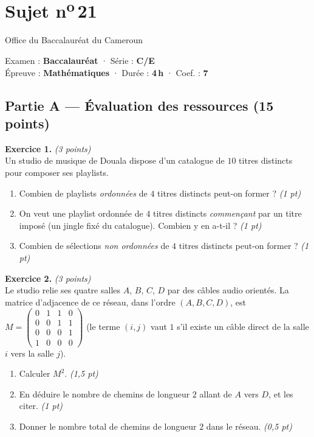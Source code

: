 \section{Sujet n\textsuperscript{o}\,21}
\noindent\begin{minipage}{0.5\linewidth}\footnotesize Office du Baccalauréat du Cameroun\end{minipage}%
\hfill\begin{minipage}{0.45\linewidth}\footnotesize\raggedleft Examen : \textbf{Baccalauréat} · Série : \textbf{C/E}\\
Épreuve : \textbf{Mathématiques} · Durée : \textbf{4\,h} · Coef. : \textbf{7}\end{minipage}
\par\smallskip{\color{onbo}\rule{\linewidth}{1pt}}

\subsection*{Partie A — Évaluation des ressources \hfill (15 points)}

\noindent\textbf{Exercice 1.} \hfill\textit{(3 points)}\\
Un studio de musique de Douala dispose d'un catalogue de $10$ titres distincts pour
composer ses playlists.
\begin{enumerate}[label=\arabic*)]
\item Combien de playlists \emph{ordonnées} de $4$ titres distincts peut-on former ? \hfill\textit{(1 pt)}
\item On veut une playlist ordonnée de $4$ titres distincts \emph{commençant} par un titre
imposé (un jingle fixé du catalogue). Combien y en a-t-il ? \hfill\textit{(1 pt)}
\item Combien de sélections \emph{non ordonnées} de $4$ titres distincts peut-on former ? \hfill\textit{(1 pt)}
\end{enumerate}

\smallskip
\noindent\textbf{Exercice 2.} \hfill\textit{(3 points)}\\
Le studio relie ses quatre salles $A$, $B$, $C$, $D$ par des câbles audio orientés. La
matrice d'adjacence de ce réseau, dans l'ordre $(A,B,C,D)$, est
$\displaystyle M=\begin{pmatrix}0&1&1&0\\0&0&1&1\\0&0&0&1\\1&0&0&0\end{pmatrix}$
(le terme $(i,j)$ vaut $1$ s'il existe un câble direct de la salle $i$ vers la salle $j$).
\begin{enumerate}[label=\arabic*)]
\item Calculer $M^2$. \hfill\textit{(1,5 pt)}
\item En déduire le nombre de chemins de longueur $2$ allant de $A$ vers $D$, et les citer. \hfill\textit{(1 pt)}
\item Donner le nombre total de chemins de longueur $2$ dans le réseau. \hfill\textit{(0,5 pt)}
\end{enumerate}

